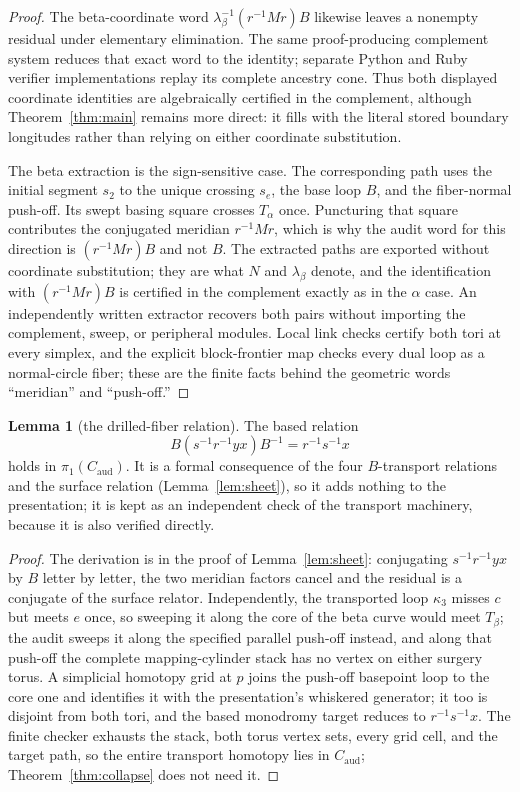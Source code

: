 \documentclass[11pt]{article}
\newcommand{\pione}{\pi_1}
\theoremstyle{definition}
\newtheorem{lemma}[theorem]{Lemma}
\begin{document}
\begin{proof}
The beta-coordinate word
$\lambda_\beta^{-1}(r^{-1}Mr)B$ likewise leaves a nonempty residual
under elementary elimination.  The same proof-producing complement system
reduces that exact word to the identity; separate Python and Ruby verifier
implementations replay its complete ancestry cone.  Thus both displayed
coordinate identities are algebraically certified in the complement, although
Theorem~\ref{thm:main} remains more direct: it fills with the literal stored
boundary longitudes rather than relying on either coordinate substitution.

The beta extraction is the sign-sensitive case.  The corresponding path
uses the initial segment $s_2$ to the unique crossing $s_e$, the base loop
$B$, and the fiber-normal push-off.  Its swept basing square crosses
$T_\alpha$ once.  Puncturing that square contributes the conjugated
meridian $r^{-1}Mr$, which is why the audit word for this direction is
$(r^{-1}Mr)B$ and not $B$.  The extracted paths are exported without
coordinate substitution; they are what $N$ and $\lambda_\beta$ denote, and
the identification with $(r^{-1}Mr)B$ is
certified in the complement exactly as in the $\alpha$ case.
An independently written extractor recovers both pairs without importing
the complement, sweep, or peripheral modules.  Local link checks certify
both tori at every simplex, and the explicit block-frontier map checks every
dual loop as a normal-circle fiber; these are the finite facts behind the
geometric words ``meridian'' and ``push-off.''
\end{proof}

\begin{lemma}[the drilled-fiber relation]\label{lem:drilled}
The based relation
\[
 B(s^{-1}r^{-1}yx)B^{-1}=r^{-1}s^{-1}x
\]
holds in $\pione(C_{\mathrm{aud}})$.  It is a formal consequence of the
four $B$-transport relations and the surface relation
(Lemma~\ref{lem:sheet}), so it adds nothing to the presentation; it is kept
as an independent check of the transport machinery, because it is also
verified directly.
\end{lemma}

\begin{proof}
The derivation is in the proof of Lemma~\ref{lem:sheet}: conjugating
$s^{-1}r^{-1}yx$ by $B$ letter by letter, the two meridian factors cancel
and the residual is a conjugate of the surface relator.  Independently, the
transported loop $\kappa_3$ misses $c$ but meets $e$ once, so sweeping it
along the core of the beta curve would meet $T_\beta$; the audit sweeps it
along the specified parallel push-off instead, and along that push-off the
complete mapping-cylinder stack has no vertex on either surgery torus.  A
simplicial homotopy grid at $p$ joins the push-off basepoint loop to the
core one and identifies it with the presentation's whiskered generator; it
too is disjoint from both tori, and the based monodromy target reduces to
$r^{-1}s^{-1}x$.  The finite checker exhausts the stack, both torus vertex
sets, every grid cell, and the target path, so the entire transport homotopy
lies in $C_{\mathrm{aud}}$; Theorem~\ref{thm:collapse} does not need it.
\end{proof}
\end{document}
